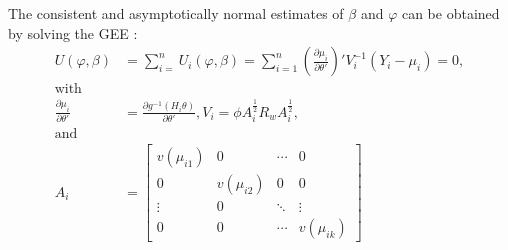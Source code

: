 \documentclass[compress]{beamer}
\begin{document}
{The consistent and asymptotically normal estimates of $\beta$ and $\varphi$ can be obtained by solving the GEE \cite{liang1986longitudinal}: 
\begin{align*}
U(\varphi,\beta) & =\sum_{i=}^{n}U_{i}(\varphi,\beta)=\sum_{i=1}^{n}(\frac{\partial\mu_{i}}{\partial\theta'})'V_i^{-1}(Y_{i}-\mu_{i})=0,\\
\textrm{with}\\
\frac{\partial\mu_{i}}{\partial\theta'} & =\frac{\partial g^{-1}(H_{i}\theta)}{\partial\theta'}, V_i = \phi A_{i}^{\frac{1}{2}}R_{w}A_{i}^{\frac{1}{2}},\\
\textrm{and}\\
A_{i} &= 
\begin{bmatrix}
 v(\mu_{i1}) & 0 & \cdots & 0\\
 0 & v(\mu_{i2}) & 0 & 0\\
 \vdots & 0 & \ddots & \vdots\\
 0 & 0 & \cdots & v(\mu_{ik})
\end{bmatrix}
\end{align*}


}
\end{document}
